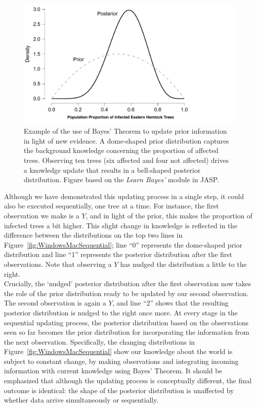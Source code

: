 \documentclass[man, floatsintext]{apa7} %
\begin{document}
\begin{figure}[h]
\begin{center}
\includegraphics[width = .785\paperwidth]{WindowsMacPriorPosterior.pdf}
\caption{Example of the use of Bayes' Theorem to update prior information in light of new evidence. A dome-shaped prior distribution captures the background knowledge concerning the proportion of affected trees. Observing ten trees (six affected and four not affected) drives a knowledge update that results in a bell-shaped posterior distribution. Figure based on the \emph{Learn Bayes'} module in JASP.}
\label{fig:WindowsMacPriorPosterior}
\end{center}
\end{figure}

Although we have demonstrated this updating process in a single step, it could also be executed sequentially, one tree at a time. For instance, the first observation we make is a $Y$, and in light of the prior, this makes the proportion of infected trees a bit higher. This slight change in knowledge is reflected in the difference between the distributions on the top two lines in Figure~\ref{fig:WindowsMacSequential}; line ``0'' represents the dome-shaped prior distribution and line ``1'' represents the posterior distribution after the first observations. Note that observing a $Y$ has nudged the distribution a little to the right. \\

Crucially, the `nudged' posterior distribution after the first observation now takes the role of the prior distribution ready to be updated by our second observation. The second observation is again a $Y$, and line ``2'' shows that the resulting posterior distribution is nudged to the right once more. At every stage in the sequential updating process, the posterior distribution based on the observations seen so far becomes the prior distribution for incorporating the information from the next observation. Specifically, the changing distributions in Figure~\ref{fig:WindowsMacSequential} show our knowledge about the world is subject to constant change, by making observations and integrating incoming information with current knowledge using Bayes' Theorem. It should be emphasized that although the updating process is conceptually different, the final outcome is identical: the shape of the posterior distribution is unaffected by whether data arrive simultaneously or sequentially. \\
\end{document}
